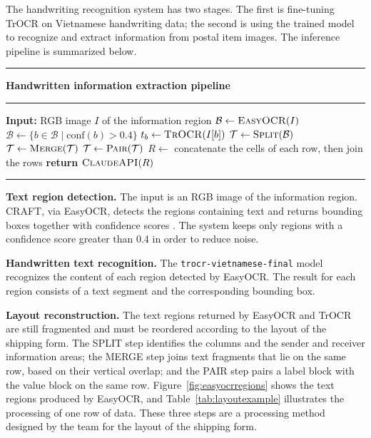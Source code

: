 The handwriting recognition system has two stages. The first is fine-tuning TrOCR on Vietnamese handwriting data; the second is using the trained model to recognize and extract information from postal item images. The inference pipeline is summarized below.

\begin{center}
\begin{minipage}{\textwidth}
\hrule\vspace{3pt}
\noindent\textbf{Handwritten information extraction pipeline}
\vspace{3pt}\hrule\vspace{4pt}
\begin{algorithmic}[1]
\State \textbf{Input:} RGB image $I$ of the information region
\State $\mathcal{B} \gets \textsc{EasyOCR}(I)$ 
\State $\mathcal{B} \gets \{b \in \mathcal{B} \mid \mathrm{conf}(b) > 0.4\}$ 
    \State $t_b \gets \textsc{TrOCR}(I[b])$ 
\EndFor
\State $\mathcal{T} \gets \textsc{Split}(\mathcal{B})$ 
\State $\mathcal{T} \gets \textsc{Merge}(\mathcal{T})$ 
\State $\mathcal{T} \gets \textsc{Pair}(\mathcal{T})$ 
\State $R \gets$ concatenate the cells of each row, then join the rows
\State \textbf{return} $\textsc{ClaudeAPI}(R)$ 
\end{algorithmic}
\vspace{2pt}\hrule
\end{minipage}
\end{center}

\textbf{Text region detection.} The input is an RGB image of the information region. CRAFT, via EasyOCR, detects the regions containing text and returns bounding boxes together with confidence scores \cite{baek2019craft, easyocr}. The system keeps only regions with a confidence score greater than 0.4 in order to reduce noise.

\textbf{Handwritten text recognition.} The \texttt{trocr-vietnamese-final} model recognizes the content of each region detected by EasyOCR. The result for each region consists of a text segment and the corresponding bounding box.

\textbf{Layout reconstruction.} The text regions returned by EasyOCR and TrOCR are still fragmented and must be reordered according to the layout of the shipping form. The SPLIT step identifies the columns and the sender and receiver information areas; the MERGE step joins text fragments that lie on the same row, based on their vertical overlap; and the PAIR step pairs a label block with the value block on the same row. Figure~\ref{fig:easyocrregions} shows the text regions produced by EasyOCR, and Table~\ref{tab:layoutexample} illustrates the processing of one row of data. These three steps are a processing method designed by the team for the layout of the shipping form.

